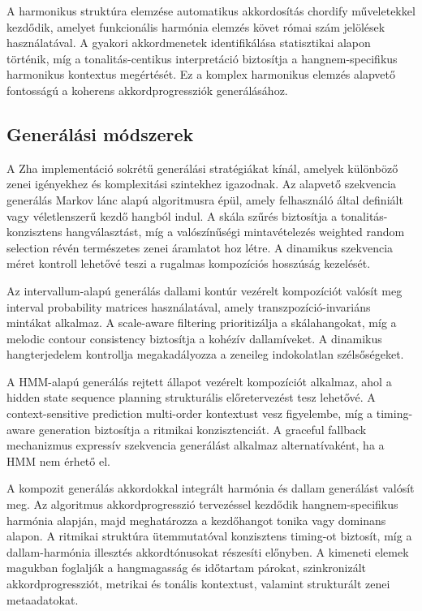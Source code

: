 A harmonikus struktúra elemzése automatikus akkordosítás chordify műveletekkel kezdődik, amelyet funkcionális harmónia elemzés követ római szám jelölések használatával. A gyakori akkordmenetek identifikálása statisztikai alapon történik, míg a tonalitás-centikus interpretáció biztosítja a hangnem-specifikus harmonikus kontextus megértését. Ez a komplex harmonikus elemzés alapvető fontosságú a koherens akkordprogressziók generálásához.

\subsection{Generálási módszerek}

A Zha implementáció sokrétű generálási stratégiákat kínál, amelyek különböző zenei igényekhez és komplexitási szintekhez igazodnak. Az alapvető szekvencia generálás Markov lánc alapú algoritmusra épül, amely felhasználó által definiált vagy véletlenszerű kezdő hangból indul. A skála szűrés biztosítja a tonalitás-konzisztens hangválasztást, míg a valószínűségi mintavételezés weighted random selection révén természetes zenei áramlatot hoz létre. A dinamikus szekvencia méret kontroll lehetővé teszi a rugalmas kompozíciós hosszúság kezelését.

Az intervallum-alapú generálás dallami kontúr vezérelt kompozíciót valósít meg interval probability matrices használatával, amely transzpozíció-invariáns mintákat alkalmaz. A scale-aware filtering prioritizálja a skálahangokat, míg a melodic contour consistency biztosítja a kohézív dallamíveket. A dinamikus hangterjedelem kontrollja megakadályozza a zeneileg indokolatlan szélsőségeket.

A HMM-alapú generálás rejtett állapot vezérelt kompozíciót alkalmaz, ahol a hidden state sequence planning strukturális előretervezést tesz lehetővé. A context-sensitive prediction multi-order kontextust vesz figyelembe, míg a timing-aware generation biztosítja a ritmikai konzisztenciát. A graceful fallback mechanizmus expressív szekvencia generálást alkalmaz alternatívaként, ha a HMM nem érhető el.

A kompozit generálás akkordokkal integrált harmónia és dallam generálást valósít meg. Az algoritmus akkordprogresszió tervezéssel kezdődik hangnem-specifikus harmónia alapján, majd meghatározza a kezdőhangot tonika vagy dominans alapon. A ritmikai struktúra ütemmutatóval konzisztens timing-ot biztosít, míg a dallam-harmónia illesztés akkordtónusokat részesíti előnyben. A kimeneti elemek magukban foglalják a hangmagasság és időtartam párokat, szinkronizált akkordprogressziót, metrikai és tonális kontextust, valamint strukturált zenei metaadatokat.

